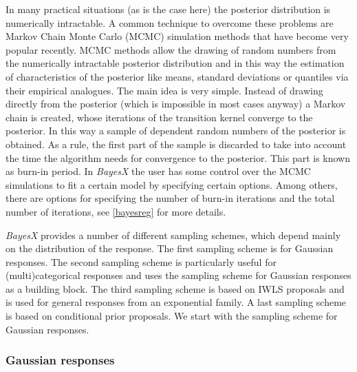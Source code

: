 In many practical situations (as is the case here) the posterior
distribution is numerically intractable. A common technique to
overcome  these problems are Markov Chain Monte Carlo (MCMC)
simulation methods that have become very popular recently. MCMC
methods allow the drawing of random numbers from the numerically
intractable posterior distribution and in this way the estimation
of characteristics of the posterior like means, standard
deviations or quantiles via their empirical analogues. The main
idea is very simple. Instead of drawing directly from the
posterior (which is impossible in most cases anyway) a Markov
chain is created, whose iterations of the transition kernel
converge to the posterior. In this way a sample of dependent
random numbers of the posterior is obtained. As a rule, the first
part of the sample is discarded to take into account the time the
algorithm needs for convergence to the posterior. This part is
known as burn-in period. In {\em BayesX} the user has some control
over the MCMC simulations to fit a certain model by specifying
certain options. Among others, there are options for specifying
the number of burn-in iterations and the total number of
iterations, see \autoref{bayesreg} for more details.

{\em BayesX} provides a number of different sampling schemes,
which depend mainly on the distribution of the response. The first
sampling scheme is for Gaussian responses. The second sampling
scheme is particularly useful for (multi)categorical responses
and uses the sampling scheme for Gaussian responses as a building
block. The third sampling scheme is based on IWLS proposals and is
used for general responses from an exponential family. A last
sampling scheme is based on conditional prior proposals. We start
with the sampling scheme for Gaussian responses.

\subsubsection{Gaussian responses}

